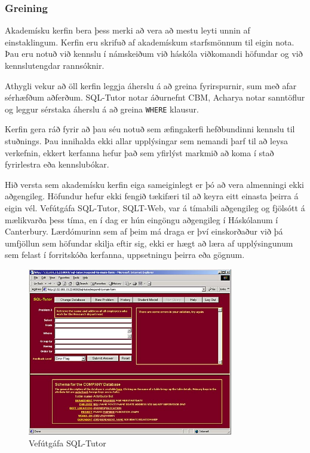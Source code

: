 \documentclass[a4paper,12pt,twoside,BCOR=10mm]{scrbook}
\begin{document}
\subsubsection{Greining}
Akademísku kerfin bera þess merki að vera að mestu leyti unnin af einstaklingum. Kerfin eru skrifuð af akademískum starfsmönnum til eigin nota. Þau eru notuð við kennslu í námskeiðum við háskóla viðkomandi höfundar og við kennslutengdar rannsóknir.

Athygli vekur að öll kerfin leggja áherslu á að greina fyrirspurnir, sum með afar sérhæfðum aðferðum. SQL-Tutor notar áðurnefnt CBM, Acharya notar sanntöflur og leggur sérstaka áherslu á að greina \texttt{WHERE} klausur.

Kerfin gera ráð fyrir að þau séu notuð sem æfingakerfi hefðbundinni kennslu til stuðnings. Þau innihalda ekki allar upplýsingar sem nemandi þarf til að leysa verkefnin, ekkert kerfanna hefur það sem yfirlýst markmið að koma í stað fyrirlestra eða kennslubókar.

Hið versta sem akademísku kerfin eiga sameiginlegt er þó að vera almenningi ekki aðgengileg. Höfundur hefur ekki fengið tækifæri til að keyra eitt einasta þeirra á eigin vél. Vefútgáfa SQL-Tutor, SQLT-Web, var á tímabili aðgengileg og fjölsótt á mælikvarða þess tíma\cite{mitrovic2003intelligent}, en í dag er hún eingöngu aðgengileg í Háskólanum í Canterbury. Lærdómurinn sem af þeim má draga er því einskorðaður við þá umfjöllun sem höfundar skilja eftir sig, ekki er hægt að læra af upplýsingunum sem felast í forritskóða kerfanna, uppsetningu þeirra eða gögnum.

\begin{figure}
\caption{Vefútgáfa SQL-Tutor\cite{mitrovic2016sqltutorweb}}
\label{fig:sqltutorweb}
\begin{center}
\includegraphics[width=0.8\textwidth]{sqlt-web}
\end{center}
\end{figure}
\end{document}
